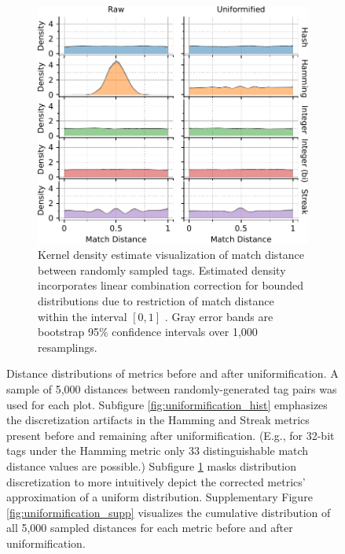 \begin{figure}
\begin{center}
\begin{minipage}{\linewidth}
\begin{subfigure}[b]{\linewidth}
\begin{minipage}{0.75\textwidth}
\begin{center}
\includegraphics[width=\columnwidth]{img/uniformification/bitweight=0dot5+seed=1+title=low-score-distribution+viz=kde+_data_hathash_hash=75684cf1e73fb7f1+_script_fullcat_hash=73c1663bd9b49595+ext=}
\end{center}
\end{minipage}
\begin{minipage}{0.23\textwidth}
\caption{
Kernel density estimate visualization of match distance between randomly sampled tags.
Estimated density incorporates linear combination correction for bounded distributions due to restriction of match distance within the interval $[0,1]$ \citep{jones1993simple}.
Gray error bands are bootstrap 95\% confidence intervals over 1,000 resamplings.
}
\label{fig:uniformification_kde}
\end{minipage}
\end{subfigure}
\end{minipage}

\caption{
Distance distributions of metrics before and after uniformification.
A sample of 5,000 distances between randomly-generated tag pairs was used for each plot.
Subfigure \ref{fig:uniformification_hist} emphasizes the discretization artifacts in the Hamming and Streak metrics present before and remaining after uniformification.
(E.g., for 32-bit tags under the Hamming metric only 33 distinguishable match distance values are possible.)
Subfigure \ref{fig:uniformification_kde} masks distribution discretization to more intuitively depict the corrected metrics' approximation of a uniform distribution.
Supplementary Figure \ref{fig:uniformification_supp} visualizes the cumulative distribution of all 5,000 sampled distances for each metric before and after uniformification.
}
\label{fig:uniformification}

\end{center}
\end{figure}

